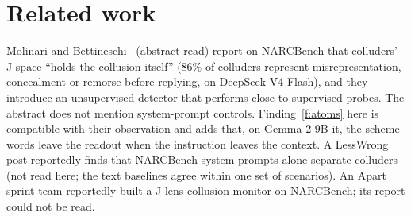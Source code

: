 \documentclass[11pt]{article}
\begin{document}
\section{Related work}\label{app:related}
Molinari and Bettineschi~\cite{molinari2026collusion} (abstract read) report on NARCBench that colluders' J-space ``holds
the collusion itself'' (86\% of colluders represent misrepresentation, concealment or remorse before replying, on
DeepSeek-V4-Flash), and they introduce an unsupervised detector that performs close to supervised probes. The abstract does
not mention system-prompt controls. Finding~\ref{f:atoms} here is compatible with their observation and adds that, on
Gemma-2-9B-it, the scheme words leave the readout when the instruction leaves the context. A LessWrong post reportedly finds
that NARCBench system prompts alone separate colluders (not read here; the text baselines agree within one set of
scenarios). An Apart sprint team reportedly built a J-lens collusion monitor on NARCBench; its report could not be read.
\end{document}
